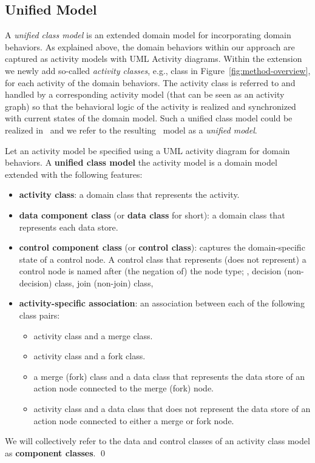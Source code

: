 \subsection{Unified Model}
\label{subsect:unifiedModel}

A \textit{unified class model} is an extended domain model for incorporating domain behaviors. As explained above, the domain behaviors within our approach are captured as activity models with UML Activity diagrams. Within the extension we newly add so-called \textit{activity classes}, e.g., class  in Figure~\ref{fig:method-overview}, for each activity of the domain behaviors. The activity class is referred to and handled by a corresponding activity model (that can be seen as an activity graph) so that the behavioral logic of the activity is realized and synchronized with current states of the domain model. Such a unified class model could be realized in \dcsl~and we refer to the resulting \dcsl~model as a \textit{unified model}.

\begin{definition} \label{def:unified-class-model}
	Let an activity model be specified using a UML activity diagram for domain behaviors. A \textbf{unified class model} \wrt the activity model is a domain model extended with the following features:
	
	\begin{itemize}%
		\item \textbf{activity class}: a domain class that represents the activity.
		\item \textbf{data component class} (or \textbf{data class} for short): a domain class that represents each data store.
		\item \textbf{control component class} (or \textbf{control class}): captures the domain-specific state of a control node. A control class that represents (does not represent) a control node is named after (the negation of) the node type; \eg, decision (non-decision) class, join (non-join) class, \etc
		\item \textbf{activity-specific association}: an association between each of the following class pairs:
		\begin{itemize}
			\item activity class and a merge class.
			\item activity class and a fork class.
			\item a merge (fork) class and a data class that represents the data store of an action node connected to the merge (fork) node.
			\item activity class and a data class that does not represent the data store of an action node connected to either a merge or fork node.
		\end{itemize}        	
	\end{itemize}
	We will collectively refer to the data and control classes of an activity class model as \textbf{component classes}. \qed
\end{definition}

